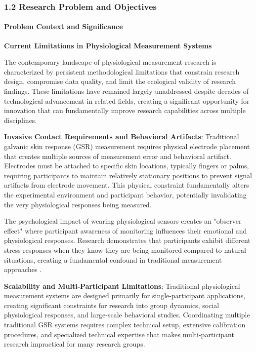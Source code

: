 \documentclass[12pt,a4paper]{report}
\begin{document}
\subsubsection{1.2 Research Problem and Objectives}

\paragraph{Problem Context and Significance}

\textbf{Current Limitations in Physiological Measurement Systems}

The contemporary landscape of physiological measurement research is characterized by persistent methodological
limitations that constrain research design, compromise data quality, and limit the ecological validity of research
findings. These limitations have remained largely unaddressed despite decades of technological advancement in related
fields, creating a significant opportunity for innovation that can fundamentally improve research capabilities across
multiple disciplines.

\textbf{Invasive Contact Requirements and Behavioral Artifacts}: Traditional galvanic skin response (GSR) measurement
requires physical electrode placement that creates multiple sources of measurement error and behavioral artifact.
Electrodes must be attached to specific skin locations, typically fingers or palms, requiring participants to maintain
relatively stationary positions to prevent signal artifacts from electrode movement. This physical constraint
fundamentally alters the experimental environment and participant behavior, potentially invalidating the very
physiological responses being measured.

The psychological impact of wearing physiological sensors creates an "observer effect" where participant awareness of
monitoring influences their emotional and physiological responses. Research demonstrates that participants exhibit
different stress responses when they know they are being monitored compared to natural situations, creating a
fundamental confound in traditional measurement approaches \cite{fowles1981publication,boucsein2012electrodermal}.

\textbf{Scalability and Multi-Participant Limitations}: Traditional physiological measurement systems are designed primarily
for single-participant applications, creating significant constraints for research into group dynamics, social
physiological responses, and large-scale behavioral studies. Coordinating multiple traditional GSR systems requires
complex technical setup, extensive calibration procedures, and specialized technical expertise that makes
multi-participant research impractical for many research groups.
\end{document}

